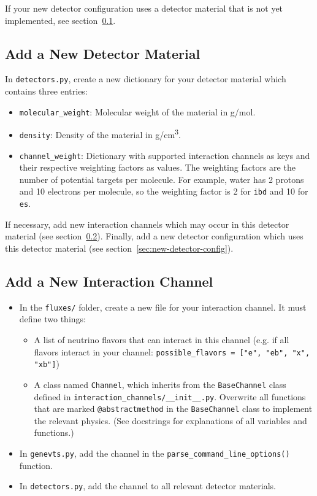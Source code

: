\documentclass[11pt, oneside]{article}
\begin{document}
If your new detector configuration uses a detector material that is not yet implemented, see section~\ref{sec:new-detector-material}.

\subsection{Add a New Detector Material}\label{sec:new-detector-material}

In \texttt{detectors.py}, create a new dictionary for your detector material which contains three entries:
\begin{itemize}
\item \texttt{molecular\_weight}: Molecular weight of the material in \si{g/mol}.
\item \texttt{density}: Density of the material in \si{g/cm^3}.
\item \texttt{channel\_weight}: Dictionary with supported interaction channels as keys and their respective weighting factors as values. The weighting factors are the number of potential targets per molecule. For example, water has 2 protons and 10 electrons per molecule, so the weighting factor is 2 for \texttt{ibd} and 10 for \texttt{es}.
\end{itemize}

If necessary, add new interaction channels which may occur in this detector material (see section~\ref{sec:new-interaction-channel}).
Finally, add a new detector configuration which uses this detector material (see section~\ref{sec:new-detector-config}).

\subsection{Add a New Interaction Channel}\label{sec:new-interaction-channel}

\begin{itemize}
\item In the \texttt{fluxes/} folder, create a new file for your interaction channel. It must define two things:
	\begin{itemize}
		\item A list of neutrino flavors that can interact in this channel (e.g. if all flavors interact in your channel: \texttt{possible\_flavors = ["e", "eb", "x", "xb"]})
		\item A class named \texttt{Channel}, which inherits from the \texttt{BaseChannel} class defined in \texttt{interaction\_channels/\_\_init\_\_.py}. Overwrite all functions that are marked \texttt{@abstractmethod} in the \texttt{BaseChannel} class to implement the relevant physics.
		(See docstrings for explanations of all variables and functions.)
	\end{itemize}
\item In \texttt{genevts.py}, add the channel in the \texttt{parse\_command\_line\_options()} function.
\item In \texttt{detectors.py}, add the channel to all relevant detector materials.
\end{itemize}
\end{document}
